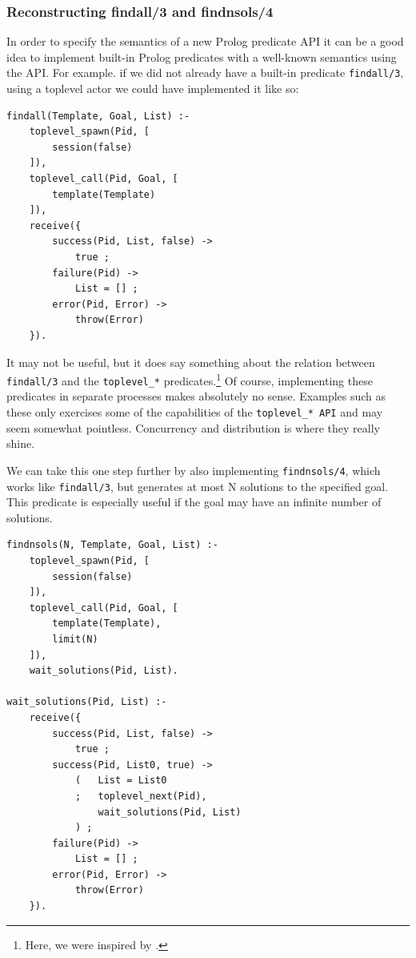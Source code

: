 \subsubsection{Reconstructing findall/3 and findnsols/4}\label{sec:reconstructing-findall}

In order to specify the semantics of a new Prolog predicate API it can be a good idea to implement built-in Prolog predicates with a well-known semantics using the API. For example. if we did not already have a built-in predicate \texttt{findall/3}, using a toplevel actor we could have implemented it like so:

\begin{verbatim}
findall(Template, Goal, List) :-
    toplevel_spawn(Pid, [
        session(false)
    ]),
    toplevel_call(Pid, Goal, [
        template(Template)
    ]),
    receive({
        success(Pid, List, false) ->
            true ;
        failure(Pid) ->
            List = [] ;
        error(Pid, Error) ->
            throw(Error)
    }).
\end{verbatim}

\noindent It may not be useful, but it does say something about the relation between \texttt{findall/3} and the \texttt{toplevel\_*} predicates.\footnote{Here, we were inspired by \cite{DBLP:conf/cl/Tarau00}.} Of course, implementing these predicates in separate processes makes absolutely no sense. Examples such as these only exercises some of the capabilities of the \texttt{toplevel\_* API} and may seem somewhat pointless. Concurrency and distribution is where they really shine.

We can take this one step further by also implementing \texttt{findnsols/4}, which works like \texttt{findall/3}, but generates at most N solutions to the specified goal. %
This predicate is especially useful if the goal may have an infinite number of solutions.

\begin{verbatim}
findnsols(N, Template, Goal, List) :-
    toplevel_spawn(Pid, [
        session(false)
    ]),
    toplevel_call(Pid, Goal, [
        template(Template),
        limit(N)
    ]),
    wait_solutions(Pid, List).

wait_solutions(Pid, List) :-
    receive({
        success(Pid, List, false) ->
            true ;
        success(Pid, List0, true) ->
            (   List = List0 
            ;   toplevel_next(Pid),
                wait_solutions(Pid, List) 
            ) ;
        failure(Pid) ->
            List = [] ;
        error(Pid, Error) ->
            throw(Error)
    }).
\end{verbatim}

